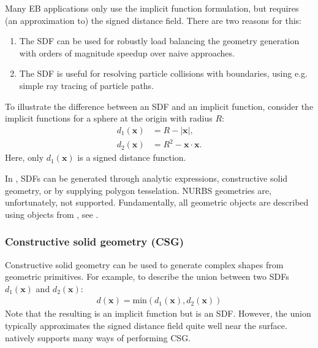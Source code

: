 \documentclass[letterpaper,10pt,english]{sphinxmanual}
\begin{document}
\sphinxAtStartPar
Many EB applications only use the implicit function formulation, but  requires (an approximation to) the signed distance field.
There are two reasons for this:
\begin{enumerate}
%
\item {} 
\sphinxAtStartPar
The SDF can be used for robustly load balancing the geometry generation with orders of magnitude speedup over naive approaches.

\item {} 
\sphinxAtStartPar
The SDF is useful for resolving particle collisions with boundaries, using e.g. simple ray tracing of particle paths.

\end{enumerate}

\sphinxAtStartPar
To illustrate the difference between an SDF and an implicit function, consider the implicit functions for a sphere at the origin with radius \(R\):
\begin{align}
d_1\left(\mathbf{x}\right) &= R - \left|\mathbf{x}\right|, \\
d_2\left(\mathbf{x}\right) &= R^2 - \mathbf{x}\cdot\mathbf{x}.
\end{align}
\sphinxAtStartPar
Here, only \(d_1\left(\mathbf{x}\right)\) is a signed distance function.

\sphinxAtStartPar
In , SDFs can be generated through analytic expressions, constructive solid geometry, or by supplying polygon tesselation.
NURBS geometries are, unfortunately, not supported.
Fundamentally, all geometric objects are described using  objects from , see {\hyperref[\detokenize{Source/ChomboBasics:chap-baseif}]{}}.


\subsubsection{Constructive solid geometry (CSG)}
\label{\detokenize{Source/SpatialDiscretization:constructive-solid-geometry-csg}}
\sphinxAtStartPar
Constructive solid geometry can be used to generate complex shapes from geometric primitives.
For example, to describe the union between two SDFs \(d_1\left(\mathbf{x}\right)\) and \(d_2\left(\mathbf{x}\right)\):
\begin{equation*}
\begin{split}d\left(\mathbf{x}\right) = \textrm{min}\left(d_1\left(\mathbf{x}\right), d_2\left(\mathbf{x}\right)\right)\end{split}
\end{equation*}
\sphinxAtStartPar
Note that the resulting is an implicit function but is  an SDF.
However, the union typically approximates the signed distance field quite well near the surface.
 natively supports many ways of performing CSG.
\end{document}
